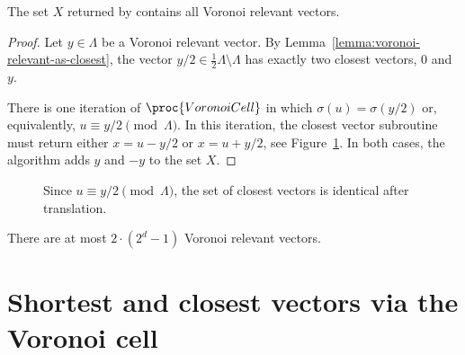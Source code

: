 \begin{lemma}
  \label{lemma:voronoi-cell-computation}
  The set $X$ returned by  contains all Voronoi relevant vectors.
\end{lemma}
\begin{proof}
  Let $y \in \Lambda$ be a Voronoi relevant vector.
  By Lemma~\ref{lemma:voronoi-relevant-as-closest},
  the vector $y/2 \in \frac{1}{2}\Lambda \setminus \Lambda$ has exactly two closest vectors,
  $0$ and $y$.

  There is one iteration of $\proc{VoronoiCell}$ in which $\sigma(u) = \sigma(y/2)$
  or, equivalently, $u \equiv y/2 \pmod{\Lambda}$.
  In this iteration, the closest vector subroutine must return
  either $x = u - y/2$ or $x = u + y/2$, see Figure~\ref{fig:voronoi-cell-computation}.
  In both cases, the algorithm adds $y$ and $-y$ to the set $X$.
\end{proof}
\begin{figure}
  \begin{center}
  \end{center}
  \caption{Since $u \equiv y/2 \pmod\Lambda$, the set of closest vectors is identical after translation.}
  \label{fig:voronoi-cell-computation}
\end{figure}


\begin{corollary}
  There are at most $2 \cdot (2^d - 1)$ Voronoi relevant vectors.
\end{corollary}



\section{Shortest and closest vectors via the Voronoi cell}

